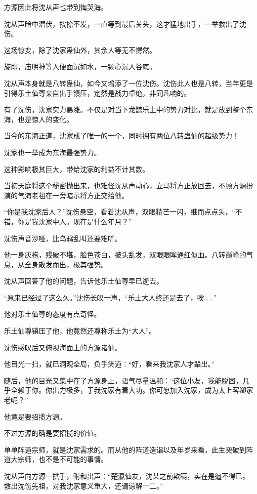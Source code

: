 \begin{this_body}
方源因此将沈从声也带到悔哭海。

沈从声暗中潜伏，按捺不发，一直等到最后关头，这才猛地出手，一举救出了沈伤。

这场惊变，除了沈家蛊仙外，其余人等无不愕然。

旋即，庙明神等人便面沉如水，一颗心沉入谷底。

沈从声本身就是八转蛊仙，如今又增添了一位沈伤。沈伤此人也是八转，当年更是引得乐土仙尊亲自出手镇压，定然是战力卓绝，非同凡响的。

有了沈伤，沈家实力暴涨。不仅是对当下龙鲸乐土中的势力对比，就是放到整个东海，也是惊人的变化。

当今的东海正道，沈家成了唯一的一个，同时拥有两位八转蛊仙的超级势力！

沈家也一举成为东海最强势力。

这种影响极其巨大，带给沈家的利益不计其数。

当初天庭将这个秘密抛出来，也难怪沈从声动心，立马将方正放回去，不顾方源扮演的气海老祖在一旁暗示将方正交给他。

“你是我沈家后人？”沈伤悬空，看着沈从声，双眼精芒一闪，继而点点头，“不错，你是我沈家中人。现在是什么年月？”

沈伤声音沙哑，比乌鸦乱叫还要难听。

他一身灰袍，残破不堪，脸色苍白，披头乱发，双眼眼眸通红似血。八转巅峰的气息，从全身散发而出，极其强势。

沈从声回答了他的问题，告诉他乐土仙尊早已逝去。

“原来已经过了这么久。”沈伤长叹一声，“乐土大人终还是去了，唉……”

他对乐土仙尊的态度有点奇怪。

乐土仙尊镇压了他，他竟然还尊称乐土为“大人”。

沈伤感叹后又俯视海面上的方源诸仙。

他目光一扫，就已洞观全局，负手笑道：“好，看来我沈家人才辈出。”

随后，他的目光又集中在了方源身上，语气尽量温和：“这位小友，我能脱困，几乎全赖于你。你出力极多，于我沈家有着大功。你可愿加入沈家，成为太上客卿家老呢？”

他竟是要招揽方源。

不过方源的确是要招揽的价值。

单单阵道宗师，就是沈家需求的。而从他的阵道造诣以及年岁来看，此生突破到阵道大宗师，也不是不可能的事情。

沈从声向方源一拱手，附和出声：“楚瀛仙友，沈某之前欺瞒，实在是逼不得已。救出沈伤先祖，对我沈家意义重大，还请谅解一二。”


\end{this_body}
